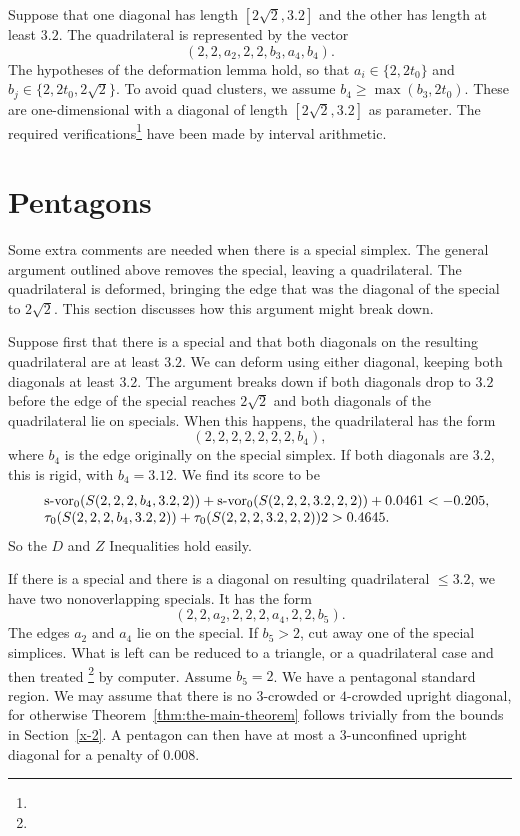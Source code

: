 Suppose that one diagonal has length $[2\sqrt{2},3.2]$ and the other has
length at least $3.2$.  The quadrilateral is represented by the vector
    $$(2,2,a_2,2,2,b_3,a_4,b_4).$$
The hypotheses of the deformation lemma hold, so that $a_i\in\{2,2t_0\}$
and $b_j\in\{2,2t_0,2\sqrt2\}$. To avoid quad clusters, we assume
$b_4\ge\max(b_3,2t_0)$. These are one-dimensional with a diagonal of
length $[2\sqrt{2},3.2]$ as parameter.
 The required verifications\footnote{} %
have been made by interval arithmetic.


\section{Pentagons}

Some extra comments are needed when there is a special simplex. The
general argument outlined above removes the special, leaving a
quadrilateral.  The quadrilateral is deformed, bringing the edge that
was the diagonal of the special to $2\sqrt{2}$. This section discusses
how this argument might break down.

Suppose first that there is a special and that both diagonals on the
resulting quadrilateral are at least $3.2$.  We can deform using either
diagonal, keeping both diagonals at least $3.2$. The argument breaks
down if both diagonals drop to $3.2$ before the edge of the special
reaches $2\sqrt{2}$ and both diagonals of the quadrilateral lie on
specials. When this happens, the quadrilateral has the form
    $$(2,2,2,2,2,2,2,b_4),$$
where $b_4$ is the edge originally on the special simplex.  If both
diagonals are $3.2$, this is rigid, with $b_4= 3.12$. We find its score
to be
    $$
    \begin{array}{lll}
    &\operatorname{s-vor}_0(S(2,2,2,b_4,3.2,2))+\operatorname{s-vor}_0(S(2,2,2,3.2,2,2))+0.0461<-0.205,\\
    &\tau_0(S(2,2,2,b_4,3.2,2))+\tau_0(S(2,2,2,3.2,2,2))2> 0.4645.\\
    \end{array}
    $$
So the $D$ and $Z$ Inequalities hold easily.

If there is a special and there is a diagonal on resulting quadrilateral
$\le3.2$, we have two nonoverlapping specials.  It has the form
    $$(2,2,a_2,2,2,2,a_4,2,2,b_5).$$
The edges $a_2$ and $a_4$ lie on the special.  If $b_5>2$, cut
away one of the special simplices.  What is left can be reduced to
a triangle, or a quadrilateral case and then treated%
\footnote{} %
by computer. %
Assume
$b_5=2$.  We have a pentagonal standard region. We may assume that
there is no $3$-crowded or $4$-crowded upright diagonal, for
otherwise Theorem~\ref{thm:the-main-theorem} follows trivially
from the bounds in Section~\ref{x-2}. A pentagon can then have at
most a $3$-unconfined upright diagonal for a penalty of $0.008$.

